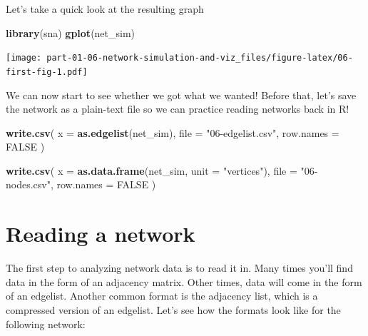 \documentclass[
]{book}
\newenvironment{Shaded}{\begin{snugshade}}{\end{snugshade}}
\newcommand{\AttributeTok}[1]{\textcolor[rgb]{0.13,0.29,0.53}{#1}}
\newcommand{\ConstantTok}[1]{\textcolor[rgb]{0.56,0.35,0.01}{#1}}
\newcommand{\FunctionTok}[1]{\textcolor[rgb]{0.13,0.29,0.53}{\textbf{#1}}}
\newcommand{\NormalTok}[1]{#1}
\newcommand{\StringTok}[1]{\textcolor[rgb]{0.31,0.60,0.02}{#1}}
\begin{document}
Let's take a quick look at the resulting graph

\begin{Shaded}
\begin{Highlighting}[]
\FunctionTok{library}\NormalTok{(sna)}
\FunctionTok{gplot}\NormalTok{(net\_sim)}
\end{Highlighting}
\end{Shaded}

\texttt{[image: part-01-06-network-simulation-and-viz\_files/figure-latex/06-first-fig-1.pdf]}

We can now start to see whether we got what we wanted! Before that, let's save the
network as a plain-text file so we can practice reading networks back in R!

\begin{Shaded}
\begin{Highlighting}[]
\FunctionTok{write.csv}\NormalTok{(}
  \AttributeTok{x         =} \FunctionTok{as.edgelist}\NormalTok{(net\_sim),}
  \AttributeTok{file      =} \StringTok{"06{-}edgelist.csv"}\NormalTok{,}
  \AttributeTok{row.names =} \ConstantTok{FALSE}
\NormalTok{  )}

\FunctionTok{write.csv}\NormalTok{(}
  \AttributeTok{x         =} \FunctionTok{as.data.frame}\NormalTok{(net\_sim, }\AttributeTok{unit =} \StringTok{"vertices"}\NormalTok{),}
  \AttributeTok{file      =} \StringTok{"06{-}nodes.csv"}\NormalTok{,}
  \AttributeTok{row.names =} \ConstantTok{FALSE}
\NormalTok{  )}
\end{Highlighting}
\end{Shaded}

\hypertarget{reading-a-network}{%
\section{Reading a network}\label{reading-a-network}}

The first step to analyzing network data is to read it in. Many times you'll find
data in the form of an adjacency matrix. Other times, data will come in the form
of an edgelist. Another common format is the adjacency list, which is a compressed
version of an edgelist. Let's see how the formats look like for the following
network:
\end{document}
